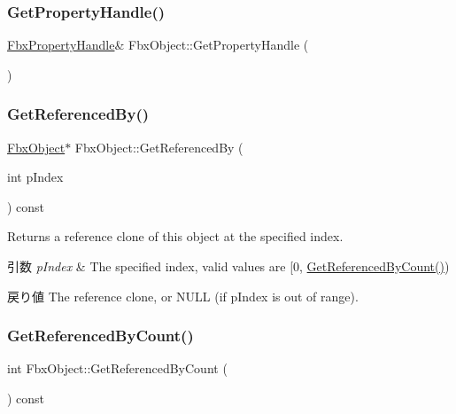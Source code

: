 \subsubsection{\texorpdfstring{Get\+Property\+Handle()}{GetPropertyHandle()}}
{\footnotesize\ttfamily \hyperlink{class_fbx_property_handle}{Fbx\+Property\+Handle}\& Fbx\+Object\+::\+Get\+Property\+Handle (\begin{DoxyParamCaption}{ }\end{DoxyParamCaption})}

\mbox{\label{class_fbx_object_a09291d887559a590239fedc4e772a4e8}} 
\subsubsection{\texorpdfstring{Get\+Referenced\+By()}{GetReferencedBy()}}
{\footnotesize\ttfamily \hyperlink{class_fbx_object}{Fbx\+Object}$\ast$ Fbx\+Object\+::\+Get\+Referenced\+By (\begin{DoxyParamCaption}\item[{int}]{p\+Index }\end{DoxyParamCaption}) const}

Returns a reference clone of this object at the specified index. 
\begin{DoxyParams}{引数}
{\em p\+Index} & The specified index, valid values are \mbox{[}0, \hyperlink{class_fbx_object_a97318ba302685288321f65144063b7c7}{Get\+Referenced\+By\+Count()}) \\
\hline
\end{DoxyParams}
\begin{DoxyReturn}{戻り値}
The reference clone, or N\+U\+LL (if p\+Index is out of range). 
\end{DoxyReturn}
\mbox{\label{class_fbx_object_a97318ba302685288321f65144063b7c7}} 
\subsubsection{\texorpdfstring{Get\+Referenced\+By\+Count()}{GetReferencedByCount()}}
{\footnotesize\ttfamily int Fbx\+Object\+::\+Get\+Referenced\+By\+Count (\begin{DoxyParamCaption}{ }\end{DoxyParamCaption}) const}

